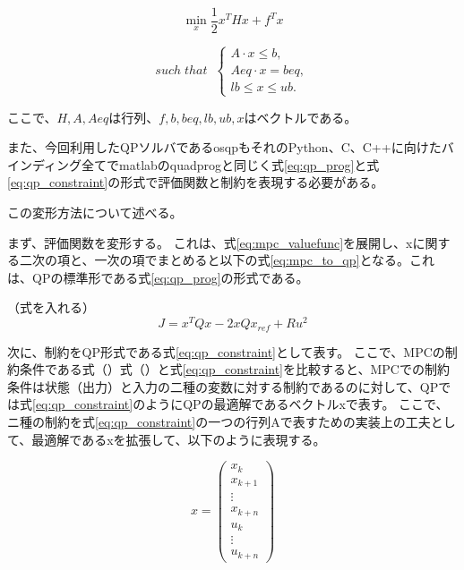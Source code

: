 \begin{equation}
  \underset{x}{\min} \frac{1}{2}x^THx + f^Tx
  \label{eq:qp_prog}
\end{equation}

\begin{equation}
  such \; that \;\;
  \begin{cases}
    A \cdot x \leq b,  \\
    Aeq \cdot x = beq, \\
    lb \leq x \leq ub.
  \end{cases}
  \label{eq:qp_constraint}
\end{equation}

ここで、$H,A,Aeq$は行列、$f,b,beq,lb,ub,x$はベクトルである。

また、今回利用したQPソルバであるosqp\cite{OSQP}もそれのPython、C、C++に向けたバインディング全てでmatlabのquadprogと同じく式\eqref{eq:qp_prog}と式\eqref{eq:qp_constraint}の形式で評価関数と制約を表現する必要がある。

この変形方法について述べる。

まず、評価関数を変形する。
これは、式\eqref{eq:mpc_valuefunc}を展開し、xに関する二次の項と、一次の項でまとめると以下の式\eqref{eq:mpc_to_qp}となる。これは、QPの標準形である式\eqref{eq:qp_prog}の形式である。

（式を入れる）
\begin{equation}
  J =  x^TQx - 2xQx_{ref} + Ru^2
  \label{eq:mpc_to_qp}
\end{equation}

次に、制約をQP形式である式\eqref{eq:qp_constraint}として表す。
ここで、MPCの制約条件である式（）式（）と式\eqref{eq:qp_constraint}を比較すると、MPCでの制約条件は状態（出力）と入力の二種の変数に対する制約であるのに対して、QPでは式\eqref{eq:qp_constraint}のようにQPの最適解であるベクトルxで表す。
ここで、ニ種の制約を式\eqref{eq:qp_constraint}の一つの行列Aで表すための実装上の工夫として、最適解であるxを拡張して、以下のように表現する。

\begin{equation}
  x =
  \begin{pmatrix}
    x_{k} \\ x_{k+1} \\ \vdots \\ x_{k+n}
    \\
    u_{k} \\ \vdots \\ u_{k+n}
  \end{pmatrix}
  \label{eq:augment_vec}
\end{equation}

